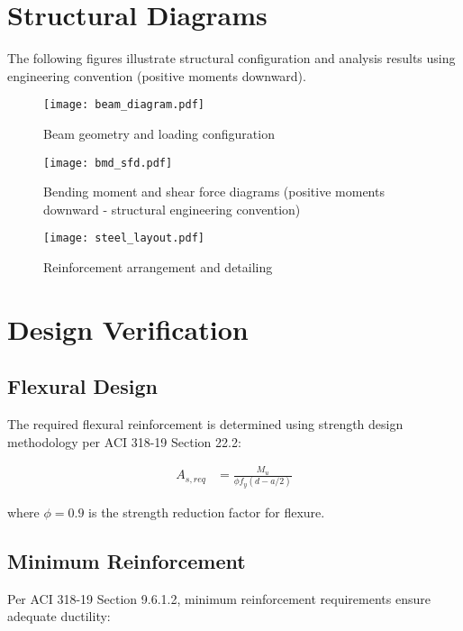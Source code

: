 \documentclass[
  10pt,
  letterpaper,
  twocolumn
]{article}
\begin{document}
\section{Structural Diagrams}

The following figures illustrate structural configuration and analysis results using engineering convention (positive moments downward).

\begin{figure}[h]
\centering
\texttt{[image: beam\_diagram.pdf]}
\caption{Beam geometry and loading configuration}
\label{fig:beam_geometry}
\end{figure}

\begin{figure*}[t]
\centering
\texttt{[image: bmd\_sfd.pdf]}
\caption{Bending moment and shear force diagrams (positive moments downward - structural engineering convention)}
\label{fig:bmd_sfd}
\end{figure*}

\begin{figure}[h]
\centering
\texttt{[image: steel\_layout.pdf]}
\caption{Reinforcement arrangement and detailing}
\label{fig:steel_layout}
\end{figure}

\section{Design Verification}

\subsection{Flexural Design}

The required flexural reinforcement is determined using strength design methodology per ACI 318-19 Section 22.2:

\begin{align}
A_{s,req} &= \frac{M_u}{\phi f_y (d - a/2)} \label{eq:steel_req}
\end{align}

where $\phi = 0.9$ is the strength reduction factor for flexure.

\subsection{Minimum Reinforcement}

Per ACI 318-19 Section 9.6.1.2, minimum reinforcement requirements ensure adequate ductility:
\end{document}
